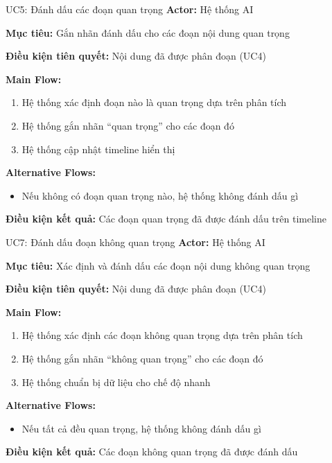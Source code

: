 \documentclass[12pt,a4paper]{article}
\newcommand{\usecasefield}[2]{%
    \textbf{#1:} #2 \par\vspace{2pt}
}
\newenvironment{mainflow}{
    \par\vspace{4pt}
    \textbf{Main Flow:}
    \begin{enumerate}[leftmargin=*, label=\arabic*., itemsep=2pt]
}{
    \end{enumerate}
}
\newenvironment{altflow}{
    \par\vspace{4pt}
    \textbf{Alternative Flows:}
    \begin{itemize}[leftmargin=*, label=\textendash, itemsep=2pt]
}{
    \end{itemize}
}
\begin{document}
\begin{usecase}{UC5: Đánh dấu các đoạn quan trọng}
    \usecasefield{Actor}{Hệ thống AI}
    \usecasefield{Mục tiêu}{Gắn nhãn đánh dấu cho các đoạn nội dung quan trọng}
    \usecasefield{Điều kiện tiên quyết}{Nội dung đã được phân đoạn (UC4)}
    \begin{mainflow}
        \item Hệ thống xác định đoạn nào là quan trọng dựa trên phân tích
        \item Hệ thống gắn nhãn ``quan trọng'' cho các đoạn đó
        \item Hệ thống cập nhật timeline hiển thị
    \end{mainflow}
    \begin{altflow}
        \item Nếu không có đoạn quan trọng nào, hệ thống không đánh dấu gì
    \end{altflow}
    \usecasefield{Điều kiện kết quả}{Các đoạn quan trọng đã được đánh dấu trên timeline}
\end{usecase}

\begin{usecase}{UC7: Đánh dấu đoạn không quan trọng}
    \usecasefield{Actor}{Hệ thống AI}
    \usecasefield{Mục tiêu}{Xác định và đánh dấu các đoạn nội dung không quan trọng}
    \usecasefield{Điều kiện tiên quyết}{Nội dung đã được phân đoạn (UC4)}
    \begin{mainflow}
        \item Hệ thống xác định các đoạn không quan trọng dựa trên phân tích
        \item Hệ thống gắn nhãn ``không quan trọng'' cho các đoạn đó
        \item Hệ thống chuẩn bị dữ liệu cho chế độ nhanh
    \end{mainflow}
    \begin{altflow}
        \item Nếu tất cả đều quan trọng, hệ thống không đánh dấu gì
    \end{altflow}
    \usecasefield{Điều kiện kết quả}{Các đoạn không quan trọng đã được đánh dấu}
\end{usecase}
\end{document}
